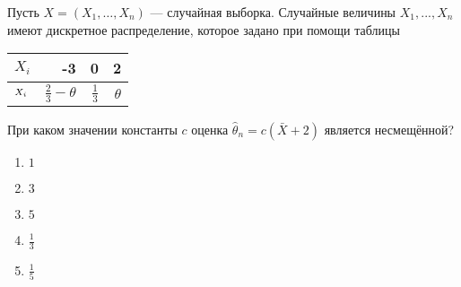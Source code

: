\documentclass[t]{beamer}
\let\P\relax
\DeclareMathOperator{\P}{\mathbb{P}}
\begin{document}
 \begin{frame} \label{47} 
\begin{block}{47} 

Пусть $X = (X_1, \ldots , X_n)$ — случайная выборка. Случайные величины $X_1, ... , X_n$ имеют дискретное распределение, которое задано при помощи таблицы

\begin{center}
\begin{tabular}{lrrr} \toprule
$X_i$  & -3 & 0 & 2 \\
\midrule
$\P_{X_i}$ & $\frac{2}{3} - \theta$ & $\frac{1}{3}$ & $\theta$\\
\bottomrule
\end{tabular}
\end{center}

При каком значении константы $c$ оценка  $\hat{\theta}_n = c (\bar{X} + 2)$ является несмещённой?
  


 \end{block} 
\begin{enumerate} 
\item[] \hyperlink{47-No}{\beamergotobutton{} $1$}
\item[] \hyperlink{47-No}{\beamergotobutton{} $3$}
\item[] \hyperlink{47-No}{\beamergotobutton{} $5$}
\item[] \hyperlink{47-No}{\beamergotobutton{} $\frac{1}{3}$}
\item[] \hyperlink{47-Yes}{\beamergotobutton{} $\frac{1}{5}$}
\end{enumerate} 
\end{frame} 
\end{document}
